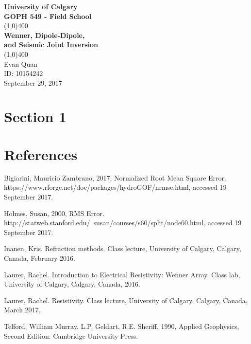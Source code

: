 \documentclass[12p]{article}
\newenvironment{hangingpar}[1]
  {\begin{list}
          {}
          {\setlength{\itemindent}{-#1}%
           \setlength{\leftmargin}{#1}%
           \setlength{\itemsep}{0pt}%
           \setlength{\parsep}{\parskip}%
           \setlength{\topsep}{\parskip}%
           }
    \setlength{\parindent}{-#1}%
    \item[]
  }
  {\end{list}}
\theoremstyle{definition}
\begin{document}
\begin{titlepage}
  \begin{center}
    \vspace*{1cm}
    \Large{\textbf{University of Calgary}}\\
    \Large{\textbf{GOPH 549 - Field School}}\\
    \vfill
    \line(1,0){400}\\[1mm]
    \huge{\textbf{Wenner, Dipole-Dipole,\\
    and Seismic Joint Inversion}}\\
    \line(1,0){400}\\
    \vfill
    Evan Quan\\
    ID: 10154242\\
    September 29, 2017
  \end{center}
\end{titlepage}
\setcounter{page}{0}
\tableofcontents
{}
\break
{}

\section{Section 1}


\section{References}
\begin{hangingpar}{2em}
  Bigiarini, Mauricio Zambrano, 2017, Normalized Root Mean Square Error.\\
  https://www.rforge.net/doc/packages/hydroGOF/nrmse.html, accessed 19 September 2017.

  Holmes, Susan, 2000, RMS Error.\\
  http://statweb.stanford.edu/~susan/courses/s60/split/node60.html, accessed 19 September 2017.

  Inanen, Kris. Refraction methods. Class lecture, University of Calgary, Calgary, Canada, February 2016.

  Laurer, Rachel. Introduction to Electrical Resistivity: Wenner Array. Class lab, University of Calgary, Calgary, Canada, 2016.

  Laurer, Rachel. Resistivity. Class lecture, University of Calgary, Calgary, Canada, March 2017.

  Telford, William Murray, L.P. Geldart, R.E. Sheriff, 1990, Applied Geophysics, Second Edition: Cambridge University Press.
\end{hangingpar}
\end{document}
